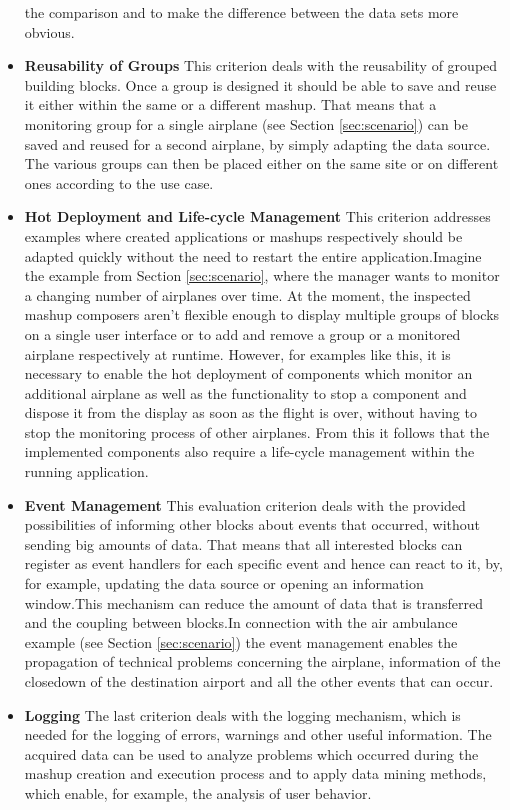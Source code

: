 \begin{itemize}
	the comparison and to make the difference between the data sets more obvious.
	\item \textbf{Reusability of Groups}\newline
	This criterion deals with the reusability of grouped building blocks. Once a group is designed it
	should be able to save and reuse it either within the same or a different mashup. That means
	that a monitoring group for a single airplane (see Section \ref{sec:scenario}) can be saved and
	reused for a second airplane, by simply adapting the data source. The various groups can then
	be placed either on the same site or on different ones according to the use case.
	\item \textbf{Hot Deployment and Life-cycle Management}\newline
	This criterion addresses examples where created applications or mashups respectively should be
	adapted quickly without the need to restart the entire application.\newline Imagine the example
	from Section \ref{sec:scenario}, where the manager wants to monitor a changing number of
	airplanes over time. At the moment, the inspected mashup composers aren't flexible enough to
	display multiple groups of blocks on a single user interface or to add and remove a group or a
	monitored airplane respectively at runtime. However, for examples like this, it is necessary to
	enable the hot deployment of components which monitor an additional airplane as well as the
	functionality to stop a component and dispose it from the display as soon as the flight is over,
	without having to stop the monitoring process of other airplanes. From this it follows that the
	implemented components also require a life-cycle management within the running application.
	\item \textbf{Event Management}\newline
	This evaluation criterion deals with the provided possibilities of informing
	other blocks about events that occurred, without sending big amounts of data.
	That means that all interested blocks can register as event handlers for each
	specific event and hence can react to it, by, for example, updating the data source or
	opening an information window.\newline This mechanism can reduce
	the amount of data that is transferred and the coupling between blocks.\newline In connection with
	the air ambulance example (see Section \ref{sec:scenario}) the event management enables
	the propagation of technical problems concerning the airplane, information of the closedown of the
	destination airport and all the other events that can occur.
	\item \textbf{Logging}\newline
	The last criterion deals with the logging mechanism, which is needed for the logging of errors,
	warnings and other useful information. The acquired data can be used to analyze problems which
	occurred during the mashup creation and execution process and to apply data mining methods, which
	enable, for example, the analysis of user behavior.
\end{itemize}

